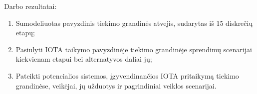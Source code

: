 

Darbo rezultatai:
\begin{enumerate}
    \item Sumodeliuotas pavyzdinis tiekimo grandinės atvejis, sudarytas iš 15 diskrečių etapų;
    \item Pasiūlyti IOTA taikymo pavyzdinėje tiekimo grandinėje sprendimų scenarijai kiekvienam etapui bei alternatyvos daliai jų;
    \item Pateikti potencialios sistemos, įgyvendinančios IOTA pritaikymą tiekimo grandinėse, veikėjai, jų užduotys ir pagrindiniai veiklos scenarijai.
\end{enumerate}